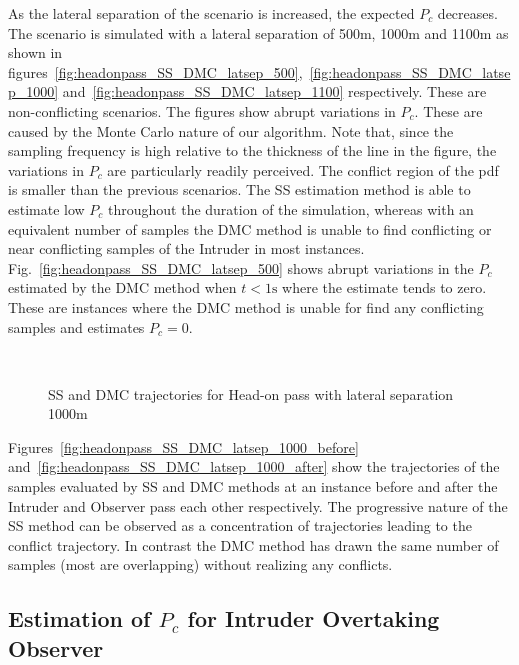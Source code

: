 \documentclass[journal]{IEEEtran}
\begin{document}
As the lateral separation of the scenario is increased, the expected $P_{c}$ decreases. The scenario is simulated with a lateral separation of 500m, 1000m and 1100m as shown in figures~\ref{fig:headonpass_SS_DMC_latsep_500},~\ref{fig:headonpass_SS_DMC_latsep_1000} and~\ref{fig:headonpass_SS_DMC_latsep_1100} respectively. These are non-conflicting scenarios. The figures show abrupt variations in $P_{c}$. These are caused by the Monte Carlo nature of our algorithm. Note that, since the sampling frequency is high relative to the thickness of the line in the figure, the variations in $P_{c}$ are particularly readily perceived. The conflict region of the pdf is smaller than the previous scenarios. The SS estimation method is able to estimate low $P_{c}$ throughout the duration of the simulation, whereas with an equivalent number of samples the DMC method is unable to find conflicting or near conflicting samples of the Intruder in most instances. Fig.~\ref{fig:headonpass_SS_DMC_latsep_500} shows abrupt variations in the $P_{c}$ estimated by the DMC method when $t < 1\text{s}$ where the estimate tends to zero. These are instances where the DMC method is unable for find any conflicting samples and estimates $P_{c} = 0$.

\begin{figure}\centering	
	\\
	\caption{SS and DMC trajectories for Head-on pass with lateral separation 1000m}
	\label{fig:headonpass_1000m_snapshot}	
\end{figure}

Figures~\ref{fig:headonpass_SS_DMC_latsep_1000_before} and~\ref{fig:headonpass_SS_DMC_latsep_1000_after} show the trajectories of the samples evaluated by SS and DMC methods at an instance before and after the Intruder and Observer pass each other respectively. The progressive nature of the SS method can be observed as a concentration of trajectories leading to the conflict trajectory. In contrast the DMC method has drawn the same number of samples (most are overlapping) without realizing any conflicts.

\subsection{Estimation of $P_{c}$ for Intruder Overtaking Observer}
\end{document}
